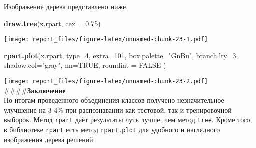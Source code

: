 \documentclass[
]{article}
\newenvironment{Shaded}{\begin{snugshade}}{\end{snugshade}}
\newcommand{\DataTypeTok}[1]{\textcolor[rgb]{0.13,0.29,0.53}{#1}}
\newcommand{\DecValTok}[1]{\textcolor[rgb]{0.00,0.00,0.81}{#1}}
\newcommand{\FloatTok}[1]{\textcolor[rgb]{0.00,0.00,0.81}{#1}}
\newcommand{\KeywordTok}[1]{\textcolor[rgb]{0.13,0.29,0.53}{\textbf{#1}}}
\newcommand{\NormalTok}[1]{#1}
\newcommand{\OtherTok}[1]{\textcolor[rgb]{0.56,0.35,0.01}{#1}}
\newcommand{\StringTok}[1]{\textcolor[rgb]{0.31,0.60,0.02}{#1}}
\begin{document}
Изображение дерева представлено ниже.

\begin{Shaded}
\begin{Highlighting}[]
\KeywordTok{draw.tree}\NormalTok{(x.rpart, }\DataTypeTok{cex =} \FloatTok{0.75}\NormalTok{)}
\end{Highlighting}
\end{Shaded}

\texttt{[image: report\_files/figure-latex/unnamed-chunk-23-1.pdf]}

\begin{Shaded}
\begin{Highlighting}[]
\KeywordTok{rpart.plot}\NormalTok{(x.rpart, }
           \DataTypeTok{type=}\DecValTok{4}\NormalTok{,}
           \DataTypeTok{extra=}\DecValTok{101}\NormalTok{, }
           \DataTypeTok{box.palette=}\StringTok{"GnBu"}\NormalTok{,}
           \DataTypeTok{branch.lty=}\DecValTok{3}\NormalTok{, }
           \DataTypeTok{shadow.col=}\StringTok{"gray"}\NormalTok{, }
           \DataTypeTok{nn=}\OtherTok{TRUE}\NormalTok{,}
           \DataTypeTok{roundint =} \OtherTok{FALSE}
\NormalTok{)}
\end{Highlighting}
\end{Shaded}

\texttt{[image: report\_files/figure-latex/unnamed-chunk-23-2.pdf]}
\#\#\#\#\textbf{Заключение}\\
По итогам проведенного объединения классов получено незначительное
улучшение на 3-4\% при распознавании как тестовой, так и тренировочной
выборок. Метод \texttt{rpart} даёт результаты чуть лучше, чем метод
\texttt{tree}. Кроме того, в библиотеке \texttt{rpart} есть метод
\texttt{rpart.plot} для удобного и наглядного изображения дерева
решений.
\end{document}
